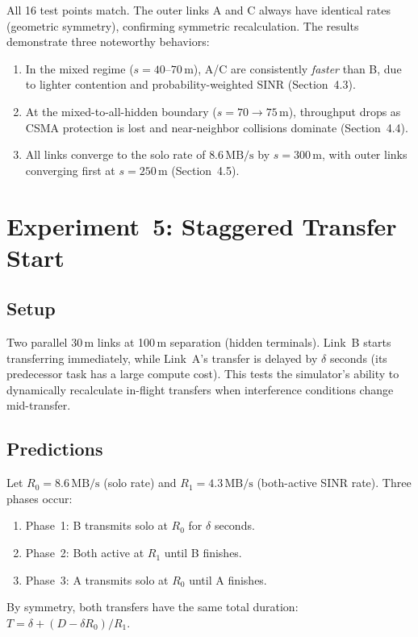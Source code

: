 \documentclass[11pt,a4paper]{article}
\newcommand{\MBs}{\,\text{MB/s}}
\begin{document}
All 16 test points match. The outer links A and C always have identical rates (geometric symmetry), confirming symmetric recalculation. The results demonstrate three noteworthy behaviors:
\begin{enumerate}
    \item In the mixed regime ($s = 40$--$70\,$m), A/C are consistently \emph{faster} than B, due to lighter contention and probability-weighted SINR (Section~4.3).
    \item At the mixed-to-all-hidden boundary ($s = 70 \to 75\,$m), throughput drops as CSMA protection is lost and near-neighbor collisions dominate (Section~4.4).
    \item All links converge to the solo rate of $8.6\MBs$ by $s = 300\,$m, with outer links converging first at $s = 250\,$m (Section~4.5).
\end{enumerate}

\section{Experiment~5: Staggered Transfer Start}
\label{sec:exp5}

\subsection{Setup}
Two parallel 30\,m links at 100\,m separation (hidden terminals). Link~B starts transferring immediately, while Link~A's transfer is delayed by $\delta$ seconds (its predecessor task has a large compute cost). This tests the simulator's ability to dynamically recalculate in-flight transfers when interference conditions change mid-transfer.

\subsection{Predictions}
Let $R_0 = 8.6\MBs$ (solo rate) and $R_1 = 4.3\MBs$ (both-active SINR rate). Three phases occur:
\begin{enumerate}
    \item Phase~1: B transmits solo at $R_0$ for $\delta$ seconds.
    \item Phase~2: Both active at $R_1$ until B finishes.
    \item Phase~3: A transmits solo at $R_0$ until A finishes.
\end{enumerate}
By symmetry, both transfers have the same total duration: $T = \delta + (D - \delta R_0)/R_1$.
\end{document}
